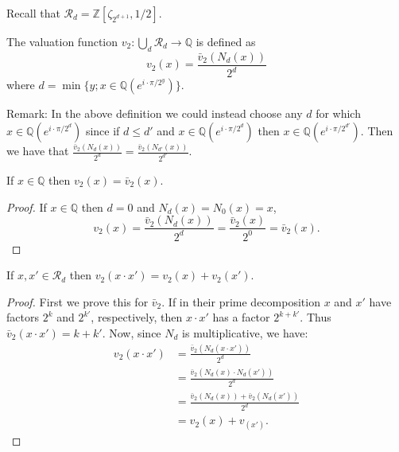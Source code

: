 \documentclass[12pt]{dalthesis}
\begin{document}
Recall that $\mathcal{R}_d = \mathbb{Z}[\zeta_{2^{d+1}}, 1/2]$.

\begin{definition}
The valuation function $v_2: \bigcup\limits_d \mathcal{R}_d \longrightarrow \mathbb{Q}$ is defined as 
\begin{equation}
v_2 (x) = \frac{\bar{v}_2 (N_d (x))}{2^d}
\end{equation}
where $d = \min\{ y; x \in \mathbb{Q} (e^{i \cdot \pi / 2^y })\}$.
\end{definition}

Remark: In the above definition we could instead choose any $d$ for which $x \in \mathbb{Q} (e^{i \cdot \pi / 2^d})$ since if $d \leq d'$ and $x \in \mathbb{Q} (e^{i \cdot \pi / 2^d})$ then $x \in \mathbb{Q} (e^{i \cdot \pi / 2^{d'}})$.
Then we have that $\frac{\bar{v}_2 (N_d (x))}{2^d} = \frac{\bar{v}_2 (N_{d'} (x))}{2^{d'}}$.

\begin{proposition}
If $x \in \mathbb{Q}$ then $v_2 (x) = \bar{v}_2 (x)$.
\end{proposition}
\begin{proof}
If $x \in \mathbb{Q}$ then $d=0$ and $N_d(x) = N_0(x) = x$,  
\begin{equation*}
v_2 (x) = \frac{\bar{v}_2 (N_d (x))}{2^d} = \frac{\bar{v}_2 (x)}{2^0} = \bar{v}_2 (x).
\end{equation*}
\end{proof}

\begin{proposition}
\label{v2additive}
If $x, x' \in \mathcal{R}_d$ then $v_2 (x \cdot x') = v_2 (x) + v_2 (x')$.
\end{proposition}
\begin{proof}
First we prove this for $\bar{v}_2$. If in their prime decomposition $x$ and $x'$ have factors $2^k$ and $2^{k'}$, respectively, then $x \cdot x'$ has a factor $2^{k + k'}$. Thus $\bar{v}_2 (x \cdot x') = k+k'$. Now, since $N_d$ is multiplicative, we have:
\begin{equation*}
\begin{split}
v_2 (x \cdot x') & = \frac{\bar{v}_2 (N_d (x \cdot x'))}{2^d} \\
& = \frac{\bar{v}_2 (N_d (x) \cdot N_d(x'))}{2^d} \\
& = \frac{\bar{v}_2 (N_d(x)) + \bar{v}_2 (N_d(x'))}{2^d} \\ 
& = v_2 (x) + v_(x').
\end{split}
\end{equation*}
\end{proof}
\end{document}
